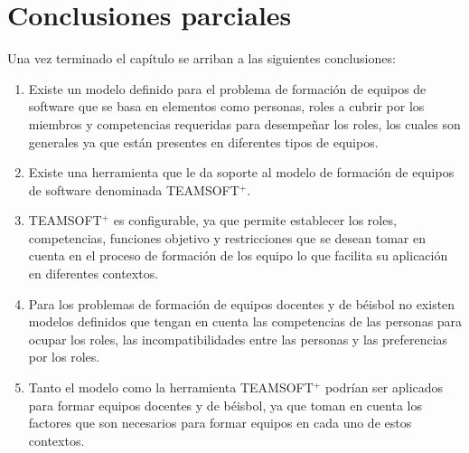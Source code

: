 \section{Conclusiones parciales}
Una vez terminado el capítulo se arriban a las siguientes conclusiones:
\begin{enumerate}
	\setlength\itemsep{0em}
	\item Existe un modelo definido para el problema de formación de equipos de software que se basa en elementos como personas, roles a cubrir por los miembros y competencias requeridas para desempeñar los roles, los cuales son generales ya que están presentes en diferentes tipos de equipos.
	\item Existe una herramienta que le da soporte al modelo de formación de equipos de software denominada TEAMSOFT$^+$.
	\item TEAMSOFT$^+$ es configurable, ya que permite establecer los roles, competencias, funciones objetivo y restricciones que se desean tomar en cuenta en el proceso de formación de los equipo lo que facilita su aplicación en diferentes contextos.
	\item Para los problemas de formación de equipos docentes y de béisbol no existen modelos definidos que tengan en cuenta las competencias de las personas para ocupar los roles, las incompatibilidades entre las personas y las preferencias por los roles.
	\item Tanto el modelo como la herramienta TEAMSOFT$^+$ podrían ser aplicados para formar equipos docentes y de béisbol, ya que toman en cuenta los factores que son necesarios para formar equipos en cada uno de estos contextos.
\end{enumerate}
\pagebreak
